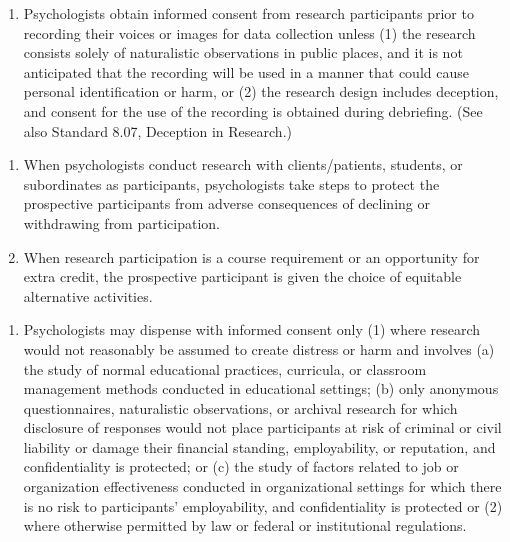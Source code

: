 \begin{fullwidth}
\begin{enumerate}
\end{enumerate}




\begin{enumerate}
\item Psychologists obtain informed consent from research participants prior to recording their voices or images for data collection unless (1) the research consists solely of naturalistic observations in public places, and it is not anticipated that the recording will be used in a manner that could cause personal identification or harm, or (2) the research design includes deception, and consent for the use of the recording is obtained during debriefing. (See also Standard 8.07, Deception in Research.)

\end{enumerate}








\begin{enumerate}


\item When psychologists conduct research with clients/patients, students, or subordinates as participants, psychologists take steps to protect the prospective participants from adverse consequences of declining or withdrawing from participation.




\item When research participation is a course requirement or an opportunity for extra credit, the prospective participant is given the choice of equitable alternative activities.


\end{enumerate}








\begin{enumerate}


\item Psychologists may dispense with informed consent only (1) where research would not reasonably be assumed
to create distress or harm and involves (a) the study of normal educational practices, curricula, or classroom management methods conducted in educational settings; (b) only anonymous questionnaires, naturalistic observations, or archival research for which disclosure of responses would not place participants at risk of criminal or civil liability or damage their financial standing, employability, or reputation, and confidentiality is protected; or (c) the study of factors related to job or organization effectiveness conducted in organizational settings for which there is no risk to participants' employability, and confidentiality is protected or (2) where otherwise permitted by law or federal or institutional regulations.




\end{enumerate}
\end{fullwidth}
